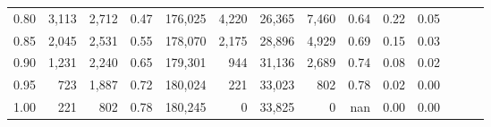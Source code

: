 \begin{tabular}{rrrrrrrrrrrrrr}
0.80 &   3,113 &  2,712 &  0.47 &  176,025 &    4,220 &  26,365 &   7,460 &  0.64 &  0.22 &      0.05 \\
0.85 &   2,045 &  2,531 &  0.55 &  178,070 &    2,175 &  28,896 &   4,929 &  0.69 &  0.15 &      0.03 \\
0.90 &   1,231 &  2,240 &  0.65 &  179,301 &      944 &  31,136 &   2,689 &  0.74 &  0.08 &      0.02 \\
0.95 &     723 &  1,887 &  0.72 &  180,024 &      221 &  33,023 &     802 &  0.78 &  0.02 &      0.00 \\
1.00 &     221 &    802 &  0.78 &  180,245 &        0 &  33,825 &       0 &   nan &  0.00 &      0.00 \\
\bottomrule
\end{tabular}
